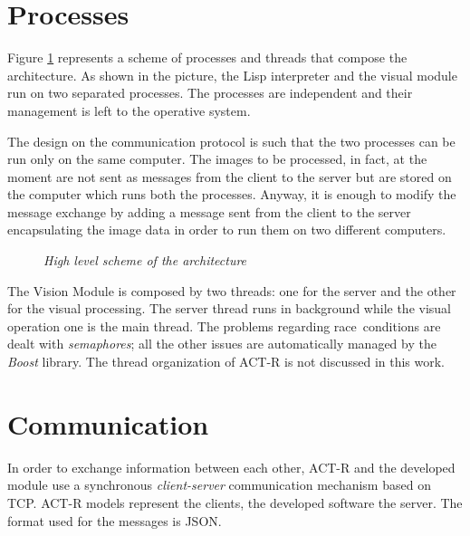 	\section{Processes}
	Figure \ref{fig:processes} represents a scheme of processes and threads that compose the architecture.
	As shown in the picture, the \mbox{Lisp} interpreter and the visual module run on two separated processes. 
	The processes are independent and their management is left to the operative system.

	The design on the communication protocol is such that the two processes can be run only on the same computer. 
	The images to be processed, in fact, at the moment are not sent as messages from the client to the server but are stored on the computer which runs both the processes.
	Anyway, it is enough to modify the message exchange by adding a message sent from the client to the server encapsulating the image data in order to run them on two different computers.
	
	\begin{figure}[h]
	  \begin{center} 
	  \end{center} 
	  \caption{\textit{High level scheme of the architecture}}  
	  \label{fig:processes}
 	\end{figure}

	
	The Vision Module is composed by two threads: one for the server and the other for the visual processing. 
	The server thread runs in background while the visual operation one is the main thread.
	The problems regarding \mbox{race conditions} are dealt with \emph{semaphores}; all the other issues are automatically managed by the \emph{Boost} library.
	The thread organization of \mbox{ACT-R} is not discussed in this work.	


	\section{Communication}
	In order to exchange information between each other, \mbox{ACT-R} and the developed module use a synchronous \emph{client-server} communication mechanism based on \mbox{TCP}. 
	\mbox{ACT-R} models represent the clients, the developed software the server. 
	The format used for the messages is \mbox{JSON}.  		

